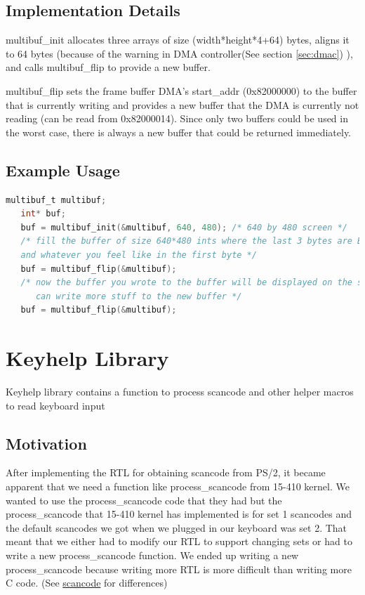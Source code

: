 \documentclass[10pt]{report}
\begin{document}
\subsection{Implementation Details}

multibuf\_init allocates three arrays of size (width*height*4+64) bytes, aligns it to 64 bytes (because of the warning in DMA controller(See section \ref{sec:dmac}) ), and calls multibuf\_flip to provide a new buffer.

multibuf\_flip sets the frame buffer DMA's start\_addr (0x82000000) to the buffer that is currently writing and provides a new buffer that the DMA is currently not reading (can be read from 0x82000014). Since only two buffers could be used in the worst case, there is always a new buffer that could be returned immediately.

\subsection{Example Usage}

\begin{lstlisting}[basicstyle=\footnotesize,language=C]
   multibuf_t multibuf;
   int* buf;
   buf = multibuf_init(&multibuf, 640, 480); /* 640 by 480 screen */
   /* fill the buffer of size 640*480 ints where the last 3 bytes are BGR (thanks to little endianness)
   and whatever you feel like in the first byte */
   buf = multibuf_flip(&multibuf); 
   /* now the buffer you wrote to the buffer will be displayed on the screen and you 
      can write more stuff to the new buffer */
   buf = multibuf_flip(&multibuf);
\end{lstlisting}

\section{Keyhelp Library}

\label{sec:keyhelp}

Keyhelp library contains a function to process scancode and other helper macros to read keyboard input

\subsection{Motivation}

After implementing the RTL for obtaining scancode from PS/2, it became apparent that we need a function like process\_scancode from 15-410 kernel. We wanted to use the process\_scancode code that they had but the process\_scancode that 15-410 kernel has implemented is for set 1 scancodes and the default scancodes we got when we plugged in our keyboard was set 2. That meant that we either had to modify our RTL to support changing sets or had to write a new process\_scancode function. We ended up writing a new process\_scancode because writing more RTL is more difficult than writing more C code. (See \href{http://en.wikipedia.org/wiki/Scancode}{scancode} for differences) 
\end{document}
